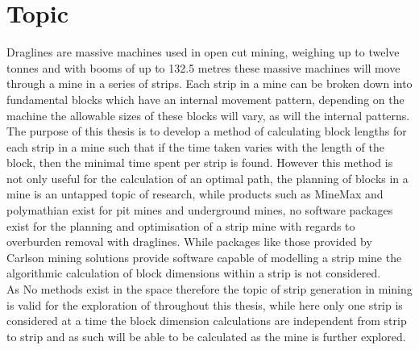 




% 
\section{Topic}
Draglines are massive machines used in open cut mining\cite{Bucyrus-Draglines}, weighing up to twelve tonnes \cite{DigBig} and with booms of up to 132.5 metres\cite{DigBig} these massive machines will move through a mine in a series of strips\cite{ORPlanning}. Each strip in a mine can be broken down into fundamental blocks which have an internal movement pattern\cite{A*Search}, depending on the machine the allowable sizes of these blocks will vary, as will the internal patterns. The purpose of this thesis is to develop a method of calculating block lengths for each strip in a mine such that if the time taken varies with the length of the block, then the minimal time spent per strip is found. However this method is not only useful for the calculation of an optimal path, the planning of blocks in a mine is an untapped topic of research, while products such as MineMax\cite{minemax} and polymathian\cite{polymathian} exist for pit mines and underground mines, no software packages exist for the planning and optimisation of a strip mine with regards to overburden removal with draglines.  While packages like those provided by Carlson mining solutions provide software capable of modelling a strip mine the algorithmic calculation of block dimensions within a strip is not considered. \cite{carlson} \\
As No methods exist in the space therefore the topic of strip generation in mining is valid for the exploration of throughout this thesis, while here only one strip is considered at a time the block dimension calculations are independent from strip to strip and as such will be able to be calculated as the mine is further explored. 


